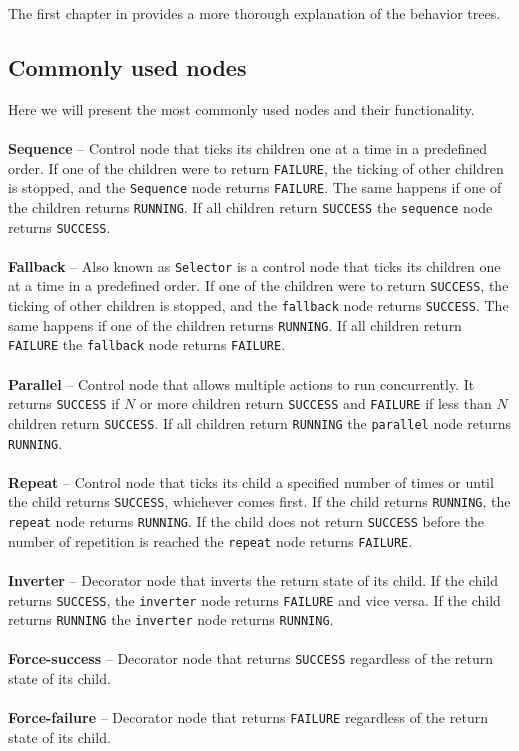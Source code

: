    \noindent The first chapter in \cite{BT_intro} provides a more thorough explanation of the behavior trees.

    \subsection{Commonly used nodes}
        Here we will present the most commonly used nodes and their functionality.\\\\
        \textbf{Sequence} -- Control node that ticks its children one at a time in a predefined order. If one of the children were to return \texttt{FAILURE}, the ticking of other children is stopped, and the \texttt{Sequence} node returns \texttt{FAILURE}. The same happens if one of the children returns \texttt{RUNNING}. If all children return \texttt{SUCCESS} the \texttt{sequence} node returns \texttt{SUCCESS}.\\\\
        \textbf{Fallback} -- Also known as \texttt{Selector} is a control node that ticks its children one at a time in a predefined order. If one of the children were to return \texttt{SUCCESS}, the ticking of other children is stopped, and the \texttt{fallback} node returns \texttt{SUCCESS}. The same happens if one of the children returns \texttt{RUNNING}. If all children return \texttt{FAILURE} the \texttt{fallback} node returns \texttt{FAILURE}.\\\\
        \textbf{Parallel} -- Control node that allows multiple actions to run concurrently. It returns \texttt{SUCCESS} if $N$ or more children return \texttt{SUCCESS} and \texttt{FAILURE} if less than $N$ children return \texttt{SUCCESS}. If all children return \texttt{RUNNING} the \texttt{parallel} node returns \texttt{RUNNING}.\\\\
        \textbf{Repeat} -- Control node that ticks its child a specified number of times or until the child returns \texttt{SUCCESS}, whichever comes first. If the child returns \texttt{RUNNING}, the \texttt{repeat} node returns \texttt{RUNNING}. If the child does not return \texttt{SUCCESS} before the number of repetition is reached the \texttt{repeat} node returns \texttt{FAILURE}.\\\\
        \textbf{Inverter} -- Decorator node that inverts the return state of its child. If the child returns \texttt{SUCCESS}, the \texttt{inverter} node returns \texttt{FAILURE} and vice versa. If the child returns \texttt{RUNNING} the \texttt{inverter} node returns \texttt{RUNNING}.\\\\
        \textbf{Force-success} -- Decorator node that returns \texttt{SUCCESS} regardless of the return state of its child.\\\\
        \textbf{Force-failure} -- Decorator node that returns \texttt{FAILURE} regardless of the return state of its child.

